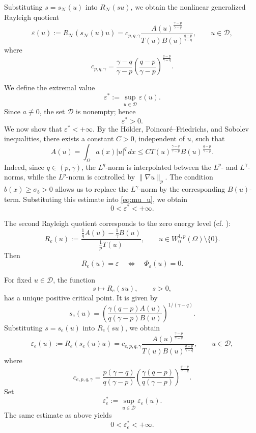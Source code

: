 \documentclass[preprint,11pt]{elsarticle}
\numberwithin{equation}{section}
\begin{document}
Substituting \(s=s_{\mathcal N}(u)\) into \(R_{\mathcal N}(su)\), we obtain
the nonlinear generalized Rayleigh quotient
\begin{equation}
	\varepsilon(u)
	:=
	R_{\mathcal N}(s_{\mathcal N}(u)u)
	=
	c_{p,q,\gamma}
	\frac{
		A(u)^{\frac{\gamma-p}{\gamma-q}}
	}{
		T(u)B(u)^{\frac{q-p}{\gamma-q}}
	},
	\qquad u\in\mathcal D,
	\label{eq:mu_u}
\end{equation}
where
\begin{equation}
	c_{p,q,\gamma}
	=
	\frac{\gamma-q}{\gamma-p}
	\left(
	\frac{q-p}{\gamma-p}
	\right)^{\frac{q-p}{\gamma-q}} .
	\label{eq:c_pq}
\end{equation}

We define the extremal value
\begin{equation}
	\varepsilon^*
	:=
	\sup_{u\in\mathcal D}\varepsilon(u).
	\label{eq:mustar}
\end{equation}
Since \(a\not\equiv0\), the set \(\mathcal D\) is nonempty; hence
\[
\varepsilon^*>0.
\]
We now show that \(\varepsilon^*<+\infty\). By the Hölder,
Poincaré--Friedrichs, and Sobolev inequalities, there exists a constant
\(C>0\), independent of \(u\), such that
\[
A(u)
=
\int_\Omega a(x)|u|^q\,dx
\le
C
T(u)^{\frac{\gamma-q}{\gamma-p}}
B(u)^{\frac{q-p}{\gamma-p}} .
\]
Indeed, since \(q\in(p,\gamma)\), the \(L^q\)-norm is interpolated between
the \(L^p\)- and \(L^\gamma\)-norms, while the \(L^p\)-norm is controlled by
\(\|\nabla u\|_p\). The condition \(b(x)\ge\sigma_b>0\) allows us to replace
the \(L^\gamma\)-norm by the corresponding \(B(u)\)-term. Substituting this
estimate into \eqref{eq:mu_u}, we obtain
\begin{equation}
	0<\varepsilon^*<+\infty .
	\label{eq:214}
\end{equation}

The second Rayleigh quotient corresponds to the zero energy level
(cf. \cite{Carles,MarcCarlIl,ilyaReil,Ilyasov2022}):
\[
R_e(u)
:=
\frac{
	\frac1qA(u)-\frac1\gamma B(u)
}{
	\frac1pT(u)
},
\qquad
u\in W^{1,p}_0(\Omega)\setminus\{0\}.
\]
Then
\[
R_e(u)=\varepsilon
\quad
\Longleftrightarrow
\quad
\Phi_\varepsilon(u)=0 .
\]

For fixed \(u\in\mathcal D\), the function
\[
s\mapsto R_e(su),
\qquad s>0,
\]
has a unique positive critical point. It is given by
\begin{equation}
	s_e(u)
	=
	\left(
	\frac{\gamma(q-p)A(u)}
	{q(\gamma-p)B(u)}
	\right)^{1/(\gamma-q)} .
	\label{eq:smu_e}
\end{equation}
Substituting \(s=s_e(u)\) into \(R_e(su)\), we obtain
\begin{equation}
	\varepsilon_e(u)
	:=
	R_e(s_e(u)u)
	=
	c_{e,p,q,\gamma}
	\frac{
		A(u)^{\frac{\gamma-p}{\gamma-q}}
	}{
		T(u)B(u)^{\frac{q-p}{\gamma-q}}
	},
	\qquad u\in\mathcal D,
	\label{eq:mu_e_u}
\end{equation}
where
\begin{equation}
	c_{e,p,q,\gamma}
	=
	\frac{p(\gamma-q)}{q(\gamma-p)}
	\left(
	\frac{\gamma(q-p)}{q(\gamma-p)}
	\right)^{\frac{q-p}{\gamma-q}} .
	\label{eq:c_pq_e}
\end{equation}
Set
\[
\varepsilon_e^*
:=
\sup_{u\in\mathcal D}\varepsilon_e(u).
\]
The same estimate as above yields
\[
0<\varepsilon_e^*<+\infty .
\]
\end{document}
